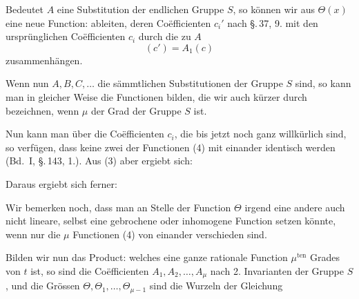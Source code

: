 Bedeutet $A$ eine Substitution der endlichen Gruppe $S$, so
können wir aus $\Theta(x)$ eine neue Function:
ableiten, deren Co\"efficienten $c_i'$ nach \S.\,37, 9. mit den ursprünglichen
Co\"efficienten $c_i$ durch die zu $A$ 
\[ (c') = A_1(c) \]
zusammenhängen.

Wenn nun $A, B, C, \dots$ die sämmtlichen Substitutionen der
Gruppe $S$ sind, so kann man in gleicher Weise die Functionen
bilden, die wir auch kürzer durch
bezeichnen, wenn $\mu$ der Grad der Gruppe $S$ ist.

Nun kann man über die Co\"efficienten $c_i$, die bis jetzt noch
ganz willkürlich sind, so verfügen, dass keine zwei der Functionen
(4) mit einander identisch werden (Bd.\ I, \S.\,143, 1.).
Aus (3) aber ergiebt sich:


Daraus ergiebt sich ferner:


Wir bemerken noch, dass man an Stelle der Function $\Theta$
irgend eine andere auch nicht lineare, selbst eine gebrochene
oder inhomogene Function setzen könnte, wenn nur die $\mu$ Functionen
(4) von einander verschieden sind.

Bilden wir nun das Product:
welches eine ganze rationale Function $\mu^{\text{ten}}$ Grades von $t$ ist, so
sind die Co\"efficienten $A_1, A_2, \dots, A_\mu$ nach 2. Invarianten der
Gruppe $S$, und die Grössen $\Theta, \Theta_1, \dots, \Theta_{\mu-1}$ sind die Wurzeln
der Gleichung
